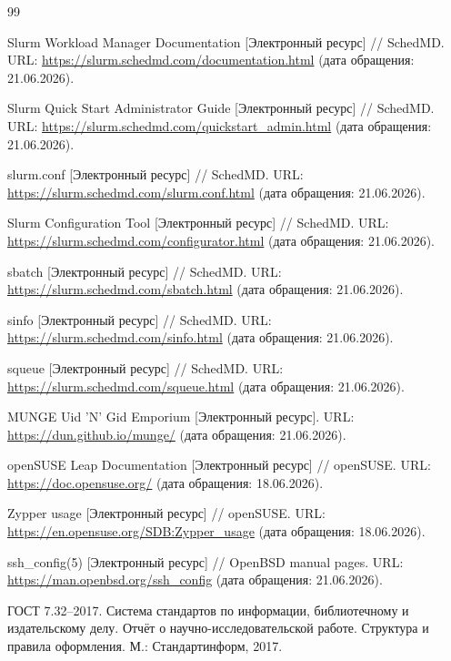 \begin{thebibliography}{99}

Slurm Workload Manager Documentation [Электронный ресурс] // SchedMD. URL: \url{https://slurm.schedmd.com/documentation.html} (дата обращения: 21.06.2026).

Slurm Quick Start Administrator Guide [Электронный ресурс] // SchedMD. URL: \url{https://slurm.schedmd.com/quickstart_admin.html} (дата обращения: 21.06.2026).

slurm.conf [Электронный ресурс] // SchedMD. URL: \url{https://slurm.schedmd.com/slurm.conf.html} (дата обращения: 21.06.2026).

Slurm Configuration Tool [Электронный ресурс] // SchedMD. URL: \url{https://slurm.schedmd.com/configurator.html} (дата обращения: 21.06.2026).

sbatch [Электронный ресурс] // SchedMD. URL: \url{https://slurm.schedmd.com/sbatch.html} (дата обращения: 21.06.2026).

sinfo [Электронный ресурс] // SchedMD. URL: \url{https://slurm.schedmd.com/sinfo.html} (дата обращения: 21.06.2026).

squeue [Электронный ресурс] // SchedMD. URL: \url{https://slurm.schedmd.com/squeue.html} (дата обращения: 21.06.2026).

MUNGE Uid 'N' Gid Emporium [Электронный ресурс]. URL: \url{https://dun.github.io/munge/} (дата обращения: 21.06.2026).

openSUSE Leap Documentation [Электронный ресурс] // openSUSE. URL: \url{https://doc.opensuse.org/} (дата обращения: 18.06.2026).

Zypper usage [Электронный ресурс] // openSUSE. URL: \url{https://en.opensuse.org/SDB:Zypper_usage} (дата обращения: 18.06.2026).

ssh\_config(5) [Электронный ресурс] // OpenBSD manual pages. URL: \url{https://man.openbsd.org/ssh_config} (дата обращения: 21.06.2026).

ГОСТ 7.32--2017. Система стандартов по информации, библиотечному и издательскому делу. Отчёт о научно-исследовательской работе. Структура и правила оформления. М.: Стандартинформ, 2017.

\end{thebibliography}
